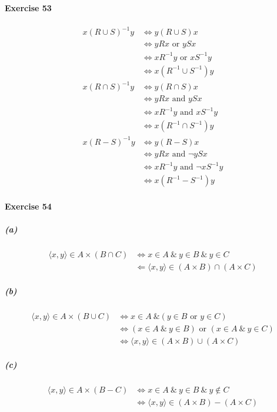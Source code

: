 \documentclass{report}
\begin{document}
    \paragraph{Exercise 53}
    \begin{align*}
        x(R \cup S)^{-1} y & \Leftrightarrow y (R \cup S) x \\
        & \Leftrightarrow yRx \text{ or } ySx \\
        & \Leftrightarrow xR^{-1}y \text{ or } xS^{-1}y \\
        & \Leftrightarrow x(R^{-1} \cup S^{-1}) y \\
        x(R \cap S)^{-1} y & \Leftrightarrow y (R \cap S) x \\
        & \Leftrightarrow yRx \text{ and } ySx \\
        & \Leftrightarrow xR^{-1}y \text{ and } xS^{-1}y \\
        & \Leftrightarrow x(R^{-1} \cap S^{-1}) y \\
        x(R - S)^{-1} y & \Leftrightarrow y (R - S) x \\
        & \Leftrightarrow yRx \text{ and } \neg ySx \\
        & \Leftrightarrow xR^{-1}y \text{ and } \neg xS^{-1}y \\
        & \Leftrightarrow x(R^{-1} - S^{-1}) y
    \end{align*}

    \paragraph{Exercise 54}
    \subparagraph{(a)}
    \begin{align*}
        \langle x,y \rangle \in A \times (B \cap C) & \Leftrightarrow x \in A \ \&\ y \in B \ \&\ y \in C \\
        & \Leftarrow \langle x,y \rangle \in (A \times B) \cap (A \times C)
    \end{align*}

    \subparagraph{(b)}
    \begin{align*}
        \langle x,y \rangle \in A \times (B \cup C) & \Leftrightarrow x \in A \ \& (y \in B \text{ or } y \in C) \\
        & \Leftrightarrow (x \in A \ \&\ y \in B) \text{ or } (x \in A \ \&\ y \in C) \\
        & \Leftrightarrow \langle x,y \rangle \in (A \times B) \cup (A \times C)
    \end{align*}

    \subparagraph{(c)}
    \begin{align*}
        \langle x,y \rangle \in A \times (B - C) & \Leftrightarrow x \in A \ \&\ y \in B \ \&\ y \notin C \\
        & \Leftrightarrow \langle x,y \rangle \in (A \times B) - (A \times C)
    \end{align*}
\end{document}
